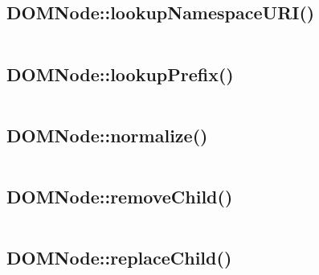 \begin{lstlisting}[language=PHP]

\end{lstlisting}


\subsection{DOMNode::lookupNamespaceURI()}


\begin{lstlisting}[language=PHP]

\end{lstlisting}


\subsection{DOMNode::lookupPrefix()}


\begin{lstlisting}[language=PHP]

\end{lstlisting}


\subsection{DOMNode::normalize()}


\begin{lstlisting}[language=PHP]

\end{lstlisting}


\subsection{DOMNode::removeChild()}


\begin{lstlisting}[language=PHP]

\end{lstlisting}


\subsection{DOMNode::replaceChild()}




\begin{lstlisting}[language=PHP]

\end{lstlisting}









